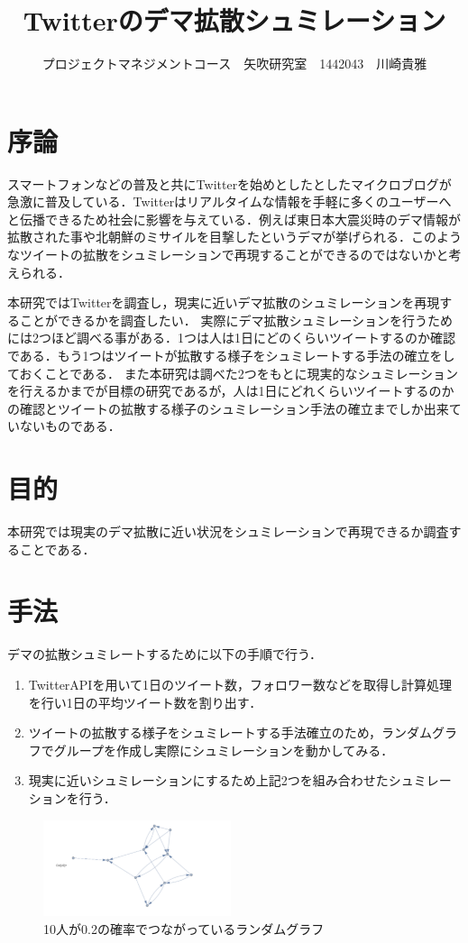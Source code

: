 \documentclass[uplatex,twocolumn,dvipdfmx]{jsarticle}
\title{\vspace{-5mm}\fontsize{14pt}{0pt}\selectfont Twitterのデマ拡散シュミレーション}
\author{\normalsize プロジェクトマネジメントコース　矢吹研究室　1442043　川崎貴雅}
\date{}
\begin{document}
\fontsize{10.5pt}{\baselineskip}\selectfont
\maketitle



\section{序論}\label{序論}

スマートフォンなどの普及と共にTwitterを始めとしたとしたマイクロブログが急激に普及している．Twitterはリアルタイムな情報を手軽に多くのユーザーへと伝播できるため社会に影響を与えている．例えば東日本大震災時のデマ情報が拡散された事や北朝鮮のミサイルを目撃したというデマが挙げられる．このようなツイートの拡散をシュミレーションで再現することができるのではないかと考えられる．

本研究ではTwitterを調査し，現実に近いデマ拡散のシュミレーションを再現することができるかを調査したい．
実際にデマ拡散シュミレーションを行うためには2つほど調べる事がある．1つは人は1日にどのくらいツイートするのか確認である．もう1つはツイートが拡散する様子をシュミレートする手法の確立をしておくことである．
また本研究は調べた2つをもとに現実的なシュミレーションを行えるかまでが目標の研究であるが，人は1日にどれくらいツイートするのかの確認とツイートの拡散する様子のシュミレーション手法の確立までしか出来ていないものである．



\section{目的}

本研究では現実のデマ拡散に近い状況をシュミレーションで再現できるか調査することである．

\section{手法}

デマの拡散シュミレートするために以下の手順で行う．
\begin{enumerate}
\item TwitterAPIを用いて1日のツイート数，フォロワー数などを取得し計算処理を行い1日の平均ツイート数を割り出す．
\item ツイートの拡散する様子をシュミレートする手法確立のため，ランダムグラフでグループを作成し実際にシュミレーションを動かしてみる\cite{netto}．
\item 現実に近いシュミレーションにするため上記2つを組み合わせたシュミレーションを行う．
\end{enumerate}
\begin{figure}[htb]
\centering
\includegraphics[width=55mm,clip]{rg.pdf}
\caption{10人が0.2の確率でつながっているランダムグラフ}\label{サンプル図}
\end{figure}
\end{document}
